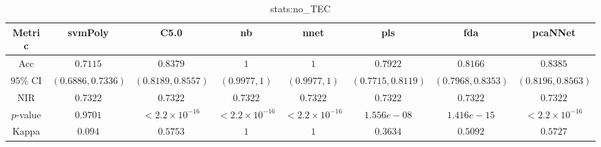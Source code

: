 \begin{table}[!ht]
	\centering
	\begin{tabular}{|c|c|c|c|c|c|c|c|}
		\hline
		Metric & svmPoly & C5.0 & nb & nnet & pls & fda & pcaNNet \\ \hline
		Acc & $0.7115$ & $0.8379$ & $1$ & $1$ & $0.7922$ & $0.8166$ & $0.8385$ \\ \hline
		$95\%$ CI & $(0.6886, 0.7336)$ & $(0.8189, 0.8557)$ & $(0.9977, 1)$ & $(0.9977, 1)$ & $(0.7715, 0.8119)$ & $(0.7968, 0.8353)$ & $(0.8196, 0.8563)$ \\ \hline
		NIR & $0.7322$ & $0.7322$ & $0.7322$ & $0.7322$ & $0.7322$ & $0.7322$ & $0.7322$ \\ \hline
		$p$-value & $0.9701$ & $< 2.2 \times {10}^{-16}$ & $< 2.2 \times {10}^{-16}$ & $< 2.2 \times {10}^{-16}$ & $1.556e-08$ & $1.416e-15$ & $< 2.2 \times {10}^{-16}$ \\ \hline
		Kappa & $0.094$ & $0.5753$ & $1$ & $1$ & $0.3634$ & $0.5092$ & $0.5727$ \\ \hline
	\end{tabular}
	\caption{stats:no_TEC}
	\label{tab:stats:no_TEC}
\end{table}
